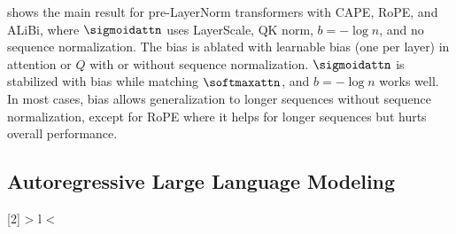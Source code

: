  shows the main result for pre-LayerNorm  transformers with CAPE, RoPE, and ALiBi, where $\sigmoidattn$ uses LayerScale, QK norm, $b=-\log n$, and no sequence normalization. The bias is ablated with learnable bias (one per layer) in attention or $Q$ with or without sequence normalization. $\sigmoidattn$ is stabilized with bias while matching $\softmaxattn$, and $b=-\log n$ works well. In most cases, bias allows generalization to longer sequences without sequence normalization, except for RoPE where it helps for longer sequences but hurts overall performance.









\subsection{Autoregressive Large Language Modeling}
\label{sec:llm}

\newcolumntype{R}[2]{%
    >{\bgroup}%
    l%
    <{\egroup}%
}
\newcommand*\rotdiag{\multicolumn{1}{R{30}{1em}}}%


